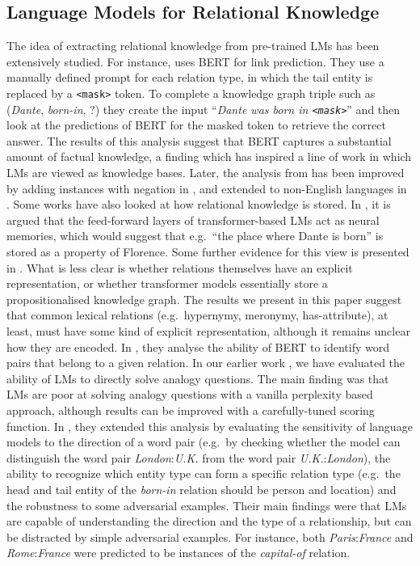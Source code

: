 \documentclass[3p]{elsarticle}
\begin{document}
{\subsection{Language Models for Relational Knowledge}
The idea of extracting relational knowledge from pre-trained LMs has been extensively studied. For instance, \cite{petroni-etal-2019-language} uses BERT for link prediction. They use a manually defined prompt for each relation type, in which the tail entity is replaced by a \texttt{<mask>} token. To complete a knowledge graph triple such as (\emph{Dante}, \emph{born-in}, ?) they create the input ``\emph{Dante was born in \texttt{<mask>}}'' and then look at the predictions of BERT for the masked token to retrieve the correct answer. The results of this analysis suggest that BERT captures a substantial amount of factual knowledge, a finding which has inspired a line of work in which LMs are viewed as knowledge bases. Later, the analysis from \cite{petroni-etal-2019-language} has been improved by adding instances with negation in \cite{kassner-schutze-2020-negated}, and extended to non-English languages in \cite{kassner-etal-2021-multilingual}. Some works have also looked at how relational knowledge is stored. In \cite{geva2020transformer}, it is argued that the feed-forward layers of transformer-based LMs act as neural memories, which would suggest that e.g.\ ``the place where Dante is born'' is stored as a property of Florence. Some further evidence for this view is presented in \cite{dai2021knowledge}. What is less clear is whether relations themselves have an explicit representation, or whether transformer models essentially store a propositionalised knowledge graph. The results we present in this paper suggest that common lexical relations (e.g.\ hypernymy, meronymy, has-attribute), at least, must have some kind of explicit representation, although it remains unclear how they are encoded. In \cite{bouraoui2020inducing}, they analyse the ability of BERT to identify word pairs that belong to a given relation. In our earlier work \cite{ushio-etal-2021-bert}, we have evaluated the ability of LMs to directly solve analogy questions. The main finding was that LMs are poor at solving analogy questions with a vanilla perplexity based approach, although results can be improved with a carefully-tuned scoring function. In \cite{rezaee-camacho-collados-2022-probing}, they extended this analysis by evaluating the sensitivity of language models to the direction of a word pair (e.g.\ by checking whether the model can distinguish the word pair \emph{London}:\emph{U.K.} from the word pair \emph{U.K.}:\emph{London}),  the ability to recognize which entity type can form a specific relation type (e.g.\ the head and tail entity of the \emph{born-in} relation should be person and location) and the robustness to some adversarial examples. Their main findings were that LMs are capable of understanding the direction and the type of a relationship, but can be distracted by simple adversarial examples. For instance, both \emph{Paris}:\emph{France} and \emph{Rome}:\emph{France} were predicted to be instances of the \emph{capital-of} relation.

}
\end{document}

